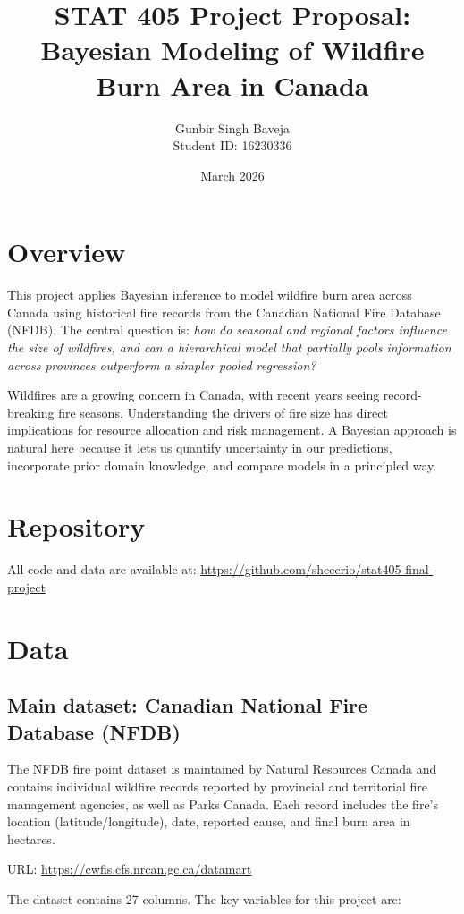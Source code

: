\documentclass[11pt]{article}
\title{STAT 405 Project Proposal:\\Bayesian Modeling of Wildfire Burn Area in Canada}
\author{Gunbir Singh Baveja \\ Student ID: 16230336}
\date{March 2026}
\begin{document}
\maketitle

\section{Overview}

This project applies Bayesian inference to model wildfire burn area across Canada using historical fire records from the Canadian National Fire Database (NFDB). The central question is: \textit{how do seasonal and regional factors influence the size of wildfires, and can a hierarchical model that partially pools information across provinces outperform a simpler pooled regression?}

Wildfires are a growing concern in Canada, with recent years seeing record-breaking fire seasons. Understanding the drivers of fire size has direct implications for resource allocation and risk management. A Bayesian approach is natural here because it lets us quantify uncertainty in our predictions, incorporate prior domain knowledge, and compare models in a principled way.

\section{Repository}

All code and data are available at: \url{https://github.com/sheeerio/stat405-final-project}

\section{Data}

\subsection{Main dataset: Canadian National Fire Database (NFDB)}

The NFDB fire point dataset is maintained by Natural Resources Canada and contains individual wildfire records reported by provincial and territorial fire management agencies, as well as Parks Canada. Each record includes the fire's location (latitude/longitude), date, reported cause, and final burn area in hectares.

\medskip
\noindent URL: \url{https://cwfis.cfs.nrcan.gc.ca/datamart}

\medskip
\noindent The dataset contains 27 columns. The key variables for this project are:
\end{document}
